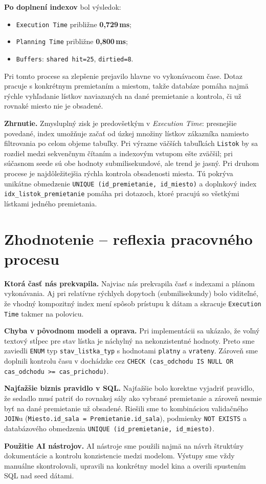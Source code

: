 \documentclass[11pt, a4paper]{article}
\begin{document}
\textbf{Po doplnení indexov} bol výsledok:
\begin{itemize}
    \item \texttt{Execution Time} približne \textbf{0{,}729\,ms};
    \item \texttt{Planning Time} približne \textbf{0{,}800\,ms};
    \item \texttt{Buffers}: \texttt{shared hit=25}, \texttt{dirtied=8}.
\end{itemize}
Pri tomto procese sa zlepšenie prejavilo hlavne vo vykonávacom čase. Dotaz pracuje s konkrétnym premietaním a miestom, takže databáze pomáha najmä rýchle vyhľadanie lístkov naviazaných na dané premietanie a kontrola, či už rovnaké miesto nie je obsadené.

\textbf{Zhrnutie.}
Zmysluplný zisk je predovšetkým v \emph{Execution Time}: presnejšie povedané, index umožňuje začať od úzkej množiny lístkov zákazníka namiesto filtrovania po celom objeme tabuľky.
Pri výrazne väčších tabuľkách \texttt{Listok} by sa rozdiel medzi sekvenčnym čítaním a indexovým vstupom ešte zväčšil; pri súčasnom seede sú obe hodnoty submilisekundové, ale trend je jasný.
Pri druhom procese je najdôležitejšia rýchla kontrola obsadenosti miesta. Tú pokrýva unikátne obmedzenie \texttt{UNIQUE (id\_premietanie, id\_miesto)} a doplnkový index \texttt{idx\_listok\_premietanie} pomáha pri dotazoch, ktoré pracujú so všetkými lístkami jedného premietania.

\section{Zhodnotenie -- reflexia pracovného procesu}
\label{sec:zhodnotenie}

\textbf{Ktorá časť nás prekvapila.}
Najviac nás prekvapila časť s indexami a plánom vykonávania. Aj pri relatívne rýchlych dopytoch (submilisekundy) bolo viditeľné, že vhodný kompozitný index mení spôsob prístupu k dátam a skracuje \texttt{Execution Time} takmer na polovicu.

\textbf{Chyba v pôvodnom modeli a oprava.}
Pri implementácii sa ukázalo, že voľný textový stĺpec pre stav lístka je náchylný na nekonzistentné hodnoty. Preto sme zaviedli \texttt{ENUM} typ \texttt{stav\_listka\_typ} s hodnotami \texttt{platny} a \texttt{vrateny}. Zároveň sme doplnili kontrolu času v dochádzke cez \texttt{CHECK (cas\_odchodu IS NULL OR cas\_odchodu >= cas\_prichodu)}.

\textbf{Najťažšie biznis pravidlo v SQL.}
Najťažšie bolo korektne vyjadriť pravidlo, že sedadlo musí patriť do rovnakej sály ako vybrané premietanie a zároveň nesmie byť na dané premietanie už obsadené. Riešili sme to kombináciou validačného \texttt{JOIN}u (\texttt{Miesto.id\_sala = Premietanie.id\_sala}), podmienky \texttt{NOT EXISTS} a databázového obmedzenia \texttt{UNIQUE (id\_premietanie, id\_miesto)}.

\textbf{Použitie AI nástrojov.}
AI nástroje sme použili najmä na návrh štruktúry dokumentácie a kontrolu konzistencie medzi modelom. Výstupy sme vždy manuálne skontrolovali, upravili na konkrétny model kina a overili spustením SQL nad seed dátami.

\printbibliography
\end{document}
